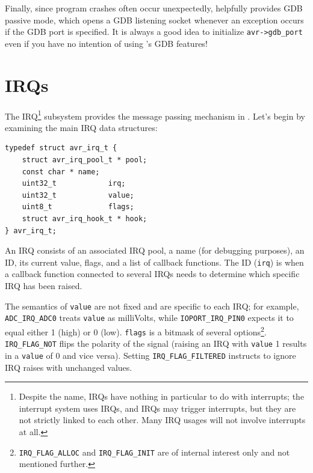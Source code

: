 Finally, since program crashes often occur unexpectedly, \simavr helpfully
provides \ac{GDB} passive mode, which
opens a \ac{GDB} listening socket whenever an exception occurs if the \ac{GDB}
port is specified. It is always a good idea to initialize \lstinline|avr->gdb_port| even
if you have no intention of using \simavr's \ac{GDB} features!


\section{\acfp{IRQ}}

The \acf{IRQ}\footnote{
%
Despite the name, \acp{IRQ} have nothing in particular to do with interrupts;
the interrupt system uses \acp{IRQ}, and \acp{IRQ} may trigger interrupts, but
they are not strictly linked to each other. Many \ac{IRQ} usages will not involve
interrupts at all.}
%
subsystem provides the message passing mechanism in \simavr. Let's begin
by examining the main \ac{IRQ} data structures:

\begin{lstlisting}
typedef struct avr_irq_t {
    struct avr_irq_pool_t * pool;
    const char * name;
    uint32_t            irq;
    uint32_t            value;
    uint8_t             flags;
    struct avr_irq_hook_t * hook;
} avr_irq_t;
\end{lstlisting}

An \ac{IRQ} consists of an associated \ac{IRQ} pool, a name (for debugging
purposes), an ID, its current value, flags, and a list of callback functions.
The ID (\lstinline|irq|) is when a callback function connected to several \acp{IRQ}
needs to determine which specific \ac{IRQ} has been raised.

The semantics of \lstinline|value| are not fixed and are specific to each \ac{IRQ};
for example, \lstinline|ADC_IRQ_ADC0| treats \lstinline|value| as milliVolts,
while \lstinline|IOPORT_IRQ_PIN0| expects it to equal either 1 (high) or 0 (low).
\lstinline|flags| is a bitmask of several options\footnote{
%
\lstinline|IRQ_FLAG_ALLOC| and \lstinline|IRQ_FLAG_INIT| are of internal interest
only and not mentioned further.
%
}.
\lstinline|IRQ_FLAG_NOT| flips
the polarity of the signal (raising an \ac{IRQ} with \lstinline|value| 1 results
in a \lstinline|value| of 0 and vice versa).
Setting \lstinline|IRQ_FLAG_FILTERED| instructs \simavr to ignore \ac{IRQ}
raises with unchanged values.

